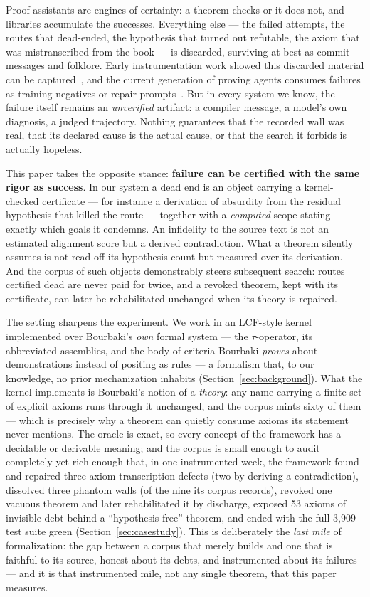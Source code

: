 \documentclass[11pt]{article}
\theoremstyle{remark}\newtheorem{example}{Example}
\begin{document}
Proof assistants are engines of certainty: a theorem checks or it does not, and
libraries accumulate the successes. Everything else --- the failed attempts, the
routes that dead-ended, the hypothesis that turned out refutable, the axiom that was
mistranscribed from the book --- is discarded, surviving at best as commit messages
and folklore. Early instrumentation work showed this discarded material can be
captured~\cite{ringer2020replica}, and the current generation of proving agents
consumes failures as training negatives or repair prompts~\cite{april2026,
goedelarchitect2026}. But in every system we know, the failure itself remains an
\emph{unverified} artifact: a compiler message, a model's own diagnosis, a judged
trajectory. Nothing guarantees that the recorded wall was real, that its declared
cause is the actual cause, or that the search it forbids is actually hopeless.

This paper takes the opposite stance: \textbf{failure can be certified with the same
rigor as success}. In our system a dead end is an object carrying a kernel-checked
certificate --- for instance a derivation of absurdity from the residual hypothesis
that killed the route --- together with a \emph{computed} scope stating exactly which
goals it condemns. An infidelity to the source text is not an estimated alignment
score but a derived contradiction. What a theorem silently assumes is not read off
its hypothesis count but measured over its derivation. And the corpus of such objects
demonstrably steers subsequent search: routes certified dead are never paid for twice,
and a revoked theorem, kept with its certificate, can later be rehabilitated
unchanged when its theory is repaired.

The setting sharpens the experiment. We work in an LCF-style kernel implemented over
Bourbaki's \emph{own} formal system --- the $\tau$-operator, its abbreviated
assemblies, and the body of criteria Bourbaki \emph{proves} about demonstrations
instead of positing as rules --- a formalism that, to our knowledge, no prior
mechanization inhabits (Section~\ref{sec:background}). What the kernel implements is
Bourbaki's notion of a \emph{theory}: any name carrying a finite set of explicit
axioms runs through it unchanged, and the corpus mints sixty of them --- which is
precisely why a theorem can quietly consume axioms its statement never mentions.
The oracle is exact, so every
concept of the framework has a decidable or derivable meaning; and the corpus is
small enough to audit completely yet rich enough that, in one instrumented week, the
framework found and repaired three axiom transcription defects (two by deriving a
contradiction), dissolved three phantom walls (of the nine its corpus records),
revoked one vacuous theorem and later
rehabilitated it by discharge, exposed 53 axioms of invisible debt behind a
``hypothesis-free'' theorem, and ended with the full 3{,}909-test suite green
(Section~\ref{sec:casestudy}). This is deliberately the \emph{last mile} of
formalization: the gap between a corpus that merely builds and one that is faithful to
its source, honest about its debts, and instrumented about its failures --- and it is
that instrumented mile, not any single theorem, that this paper measures.
\end{document}
